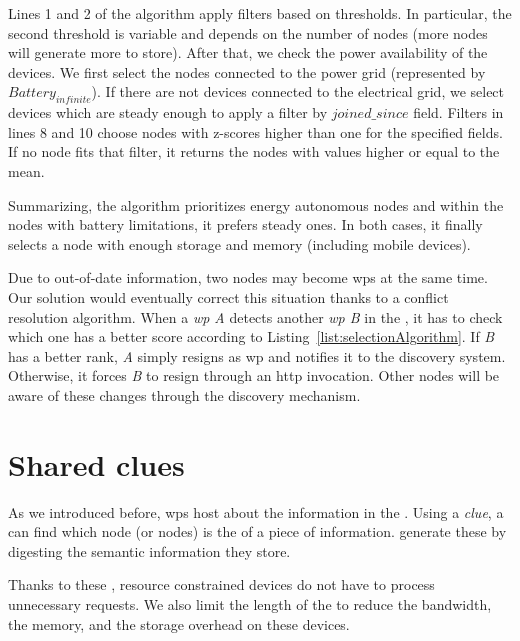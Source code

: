 Lines 1 and 2 of the algorithm apply filters based on thresholds.
In particular, the second threshold is variable and depends on the number of nodes (more nodes will generate more \clues{} to store).
After that, we check the power availability of the devices.
We first select the nodes connected to the power grid (represented by $Battery_{infinite}$).
If there are not devices connected to the electrical grid, we select devices which are steady enough to apply a filter by $joined\_since$ field.
Filters in lines 8 and 10 choose nodes with z-scores higher than one for the specified fields.
If no node fits that filter, it returns the nodes with values higher or equal to the mean.

Summarizing, the algorithm prioritizes energy autonomous nodes and within the nodes with battery limitations, it prefers steady ones.
In both cases, it finally selects a node with enough storage and memory (including mobile devices).


Due to out-of-date information, two nodes may become \acp{wp} at the same time.
Our solution would eventually correct this situation thanks to a conflict resolution algorithm.
When a \emph{\acs{wp} A} detects another \emph{\acs{wp} B} in the \Space{}, it has to check which one has a better score according to Listing~\ref{list:selectionAlgorithm}.
If \emph{B} has a better rank, \emph{A} simply resigns as \ac{wp} and notifies it to the discovery system.
Otherwise, it forces \emph{B} to resign through an \acs{http} invocation.
Other nodes will be aware of these changes through the discovery mechanism.




\section{Shared clues}
\label{sec:clues}
As we introduced before, \acp{wp} host \clues{} about the information in the \Space{}.
Using a \emph{clue}, a \consumer{} can find which node (or nodes) is the \provider{} of a piece of information.
\providers{} generate these \clues{} by digesting the semantic information they store.

Thanks to these \clues{}, resource constrained devices do not have to process unnecessary requests.
We also limit the length of the \clues{} to reduce the bandwidth, the memory, and the storage overhead on these devices.


